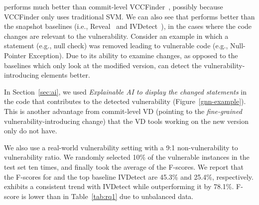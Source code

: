 
{\tool} performs much better than commit-level
VCCFinder~\cite{perl2015vccfinder}, possibly because VCCFinder only uses traditional
SVM. We can also see that {\tool} performs better than the snapshot baselines (i.e.,
Reveal~\cite{chakraborty2021deep} and
IVDetect~\cite{li2021vulnerability}), in the cases where the code
changes are relevant to the vulnerability. Consider an example in which a statement
(e.g., null check) was removed leading to vulnerable code (e.g.,
Null-Pointer Exception). Due to its ability to examine changes, as opposed to the baselines which only look at the modified version, {\tool} can detect the vulnerability-introducing elements better.


In Section~\ref{sec:ai}, we used {\em Explainable AI to display the
changed statements} in the code that contributes to the detected
vulnerability (Figure~\ref{gnn-example}). This is another advantage
from commit-level VD (pointing to the {\em fine-grained}
vulnerability-introducing change) that the VD tools working on the new
version only do not have.






We also use a real-world vulnerability setting with a 9:1
non-vulnerability to vulnerability ratio. We randomly selected 10\% of
the vulnerable instances in the test set ten times, and finally took
the average of the F-scores. We report that the F-scores for
{\tool} and the top baseline IVDetect are 45.3\% and 25.4\%,
respectively. {\tool} exhibits a consistent trend with IVDetect while
outperforming it by 78.1\%. F-score is lower than in Table~\ref{tab:rq1} due to
unbalanced data.

